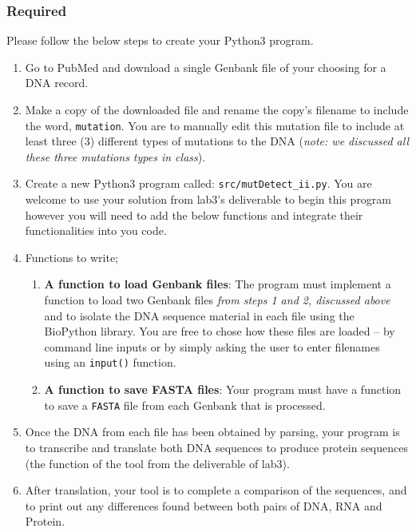 \vspace*{-.1in}
\subsubsection*{Required}
\vspace*{-.1in}

Please follow the below steps to create your Python3 program.

\begin{enumerate}
	\item Go to PubMed and download a single Genbank file of your choosing for a DNA record.
	\item Make a copy of the downloaded file and rename the copy's filename to include the word, {\tt mutation}. You are to manually edit this mutation file to include at least three (3) different types of mutations to the DNA (\emph{note: we discussed all these three mutations types in class}).
	\item Create a new Python3 program called: {\tt src/mutDetect\_ii.py}. You are welcome to use your solution from lab3's deliverable to begin this program however you will need to add the below functions and integrate their functionalities into you code.
	\item Functions to write;
	\begin{enumerate}

		\item \textbf{A function to load Genbank files}: The program must implement a function to load two Genbank files \emph{from steps 1 and 2, discussed above} and to isolate the DNA sequence material in each file using the BioPython library. You are free to chose how these files are loaded -- by command line inputs or by simply asking the user to enter filenames using an {\tt input()} function. 

		\item \textbf{A function to save FASTA files}: Your program must have a function to save a {\tt FASTA} file from each Genbank that is processed. 
	\end{enumerate}
	
	\item Once the DNA from each file has been obtained by parsing, your program is to transcribe and translate both DNA sequences to produce protein sequences (the function of the tool from the deliverable of lab3).
	\item After translation, your tool is to complete a comparison of the sequences, and to print out any differences found between both pairs of DNA, RNA and Protein. 
\end{enumerate}

